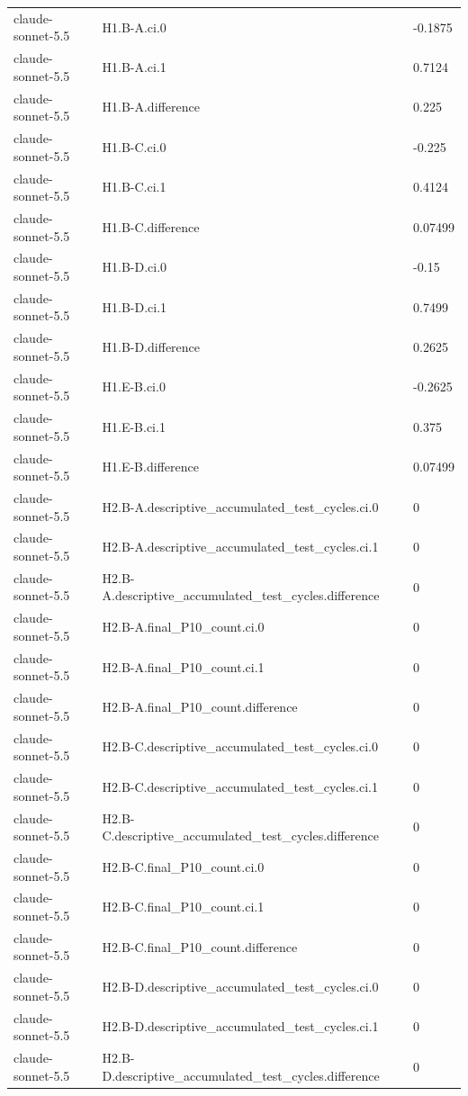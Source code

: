 \begin{tabular}{lll}
claude-sonnet-5.5 & H1.B-A.ci.0 & -0.1875 \\
claude-sonnet-5.5 & H1.B-A.ci.1 & 0.7124 \\
claude-sonnet-5.5 & H1.B-A.difference & 0.225 \\
claude-sonnet-5.5 & H1.B-C.ci.0 & -0.225 \\
claude-sonnet-5.5 & H1.B-C.ci.1 & 0.4124 \\
claude-sonnet-5.5 & H1.B-C.difference & 0.07499 \\
claude-sonnet-5.5 & H1.B-D.ci.0 & -0.15 \\
claude-sonnet-5.5 & H1.B-D.ci.1 & 0.7499 \\
claude-sonnet-5.5 & H1.B-D.difference & 0.2625 \\
claude-sonnet-5.5 & H1.E-B.ci.0 & -0.2625 \\
claude-sonnet-5.5 & H1.E-B.ci.1 & 0.375 \\
claude-sonnet-5.5 & H1.E-B.difference & 0.07499 \\
claude-sonnet-5.5 & H2.B-A.descriptive\_accumulated\_test\_cycles.ci.0 & 0 \\
claude-sonnet-5.5 & H2.B-A.descriptive\_accumulated\_test\_cycles.ci.1 & 0 \\
claude-sonnet-5.5 & H2.B-A.descriptive\_accumulated\_test\_cycles.difference & 0 \\
claude-sonnet-5.5 & H2.B-A.final\_P10\_count.ci.0 & 0 \\
claude-sonnet-5.5 & H2.B-A.final\_P10\_count.ci.1 & 0 \\
claude-sonnet-5.5 & H2.B-A.final\_P10\_count.difference & 0 \\
claude-sonnet-5.5 & H2.B-C.descriptive\_accumulated\_test\_cycles.ci.0 & 0 \\
claude-sonnet-5.5 & H2.B-C.descriptive\_accumulated\_test\_cycles.ci.1 & 0 \\
claude-sonnet-5.5 & H2.B-C.descriptive\_accumulated\_test\_cycles.difference & 0 \\
claude-sonnet-5.5 & H2.B-C.final\_P10\_count.ci.0 & 0 \\
claude-sonnet-5.5 & H2.B-C.final\_P10\_count.ci.1 & 0 \\
claude-sonnet-5.5 & H2.B-C.final\_P10\_count.difference & 0 \\
claude-sonnet-5.5 & H2.B-D.descriptive\_accumulated\_test\_cycles.ci.0 & 0 \\
claude-sonnet-5.5 & H2.B-D.descriptive\_accumulated\_test\_cycles.ci.1 & 0 \\
claude-sonnet-5.5 & H2.B-D.descriptive\_accumulated\_test\_cycles.difference & 0 \\

\end{tabular}
